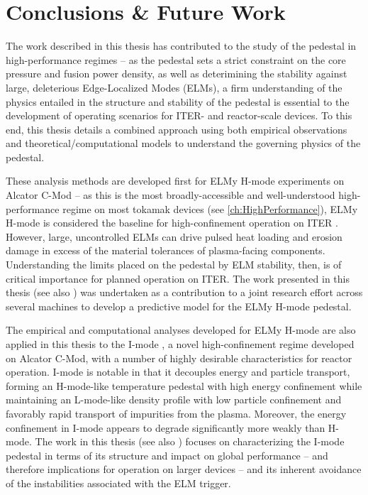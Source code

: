 \chapter{Conclusions \& Future Work}\label{ch:Conclusion}

The work described in this thesis has contributed to the study of the pedestal in high-performance regimes -- as the pedestal sets a strict constraint on the core pressure and fusion power density, as well as deterimining the stability against large, deleterious Edge-Localized Modes (ELMs), a firm understanding of the physics entailed in the structure and stability of the pedestal is essential to the development of operating scenarios for ITER- and reactor-scale devices.  To this end, this thesis details a combined approach using both empirical observations and theoretical/computational models to understand the governing physics of the pedestal.

These analysis methods are developed first for ELMy H-mode experiments on Alcator C-Mod -- as this is the most broadly-accessible and well-understood high-performance regime on most tokamak devices (see \cref{ch:HighPerformance}), ELMy H-mode is considered the baseline for high-confinement operation on ITER \cite{Shimada2007}.  However, large, uncontrolled ELMs can drive pulsed heat loading and erosion damage in excess of the material tolerances of plasma-facing components.  Understanding the limits placed on the pedestal by ELM stability, then, is of critical importance for planned operation on ITER.  The work presented in this thesis (see also \cite{Walk2012}) was undertaken as a contribution to a joint research effort across several machines \cite{Groebner2013} to develop a predictive model for the ELMy H-mode pedestal.  

The empirical and computational analyses developed for ELMy H-mode are also applied in this thesis to the I-mode \cite{Whyte2010}, a novel high-confinement regime developed on Alcator C-Mod, with a number of highly desirable characteristics for reactor operation.  I-mode is notable in that it decouples energy and particle transport, forming an H-mode-like temperature pedestal with high energy confinement while maintaining an L-mode-like density profile with low particle confinement and favorably rapid transport of impurities from the plasma.  Moreover, the energy confinement in I-mode appears to degrade significantly more weakly than H-mode.  The work in this thesis (see also \cite{Walk2014}) focuses on characterizing the I-mode pedestal in terms of its structure and impact on global performance -- and therefore implications for operation on larger devices -- and its inherent avoidance of the instabilities associated with the ELM trigger.\nicesectionending


